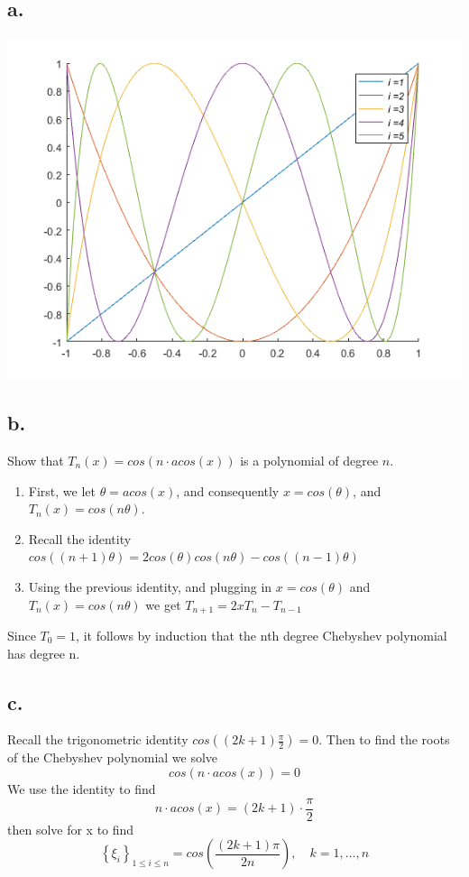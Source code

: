 \documentclass{article}
\begin{document}
\subsection*{a.}
\begin{center}
  \includegraphics[width=0.7
    \textwidth]{figures/question3}
\end{center}
\subsection*{b.}
Show that \(T_n(x)=cos(n\cdot acos(x))\) is a polynomial of degree
\(n\).
\begin{enumerate}
\item First, we let \(\theta=acos(x)\), and consequently
  \(x=cos(\theta)\), and \(T_n(x)=cos(n\theta)\).
  \item Recall the identity
    \(cos\left((n+1)\theta\right)=2cos(\theta)cos(n\theta)-cos\left((n-1)\theta\right)\)
\item Using the previous identity, and plugging in \(x=cos(\theta)\)
  and \(T_n(x)=cos(n\theta)\) we get
  \(T_{n+1}=2xT_n -T_{n-1}\)
\end{enumerate}
Since \(T_0=1\), it follows by induction that the nth degree Chebyshev
polynomial has degree n.
\subsection*{c.}
Recall the trigonometric identity
\(cos\left((2k+1)\frac{\pi}{2}\right)=0\). Then to find the roots of
the Chebyshev polynomial we solve
\[cos\left(n\cdot acos(x)\right)=0\]
We use the identity to find
\[n\cdot acos(x) = (2k+1)\cdot\frac{\pi}{2}\]
then solve for x to find
\[\left\{\xi_i\right\}_{1\leq i\leq n}=cos\left(\frac{(2k+1)\pi}{2n}\right),\quad k=1,\dots,n\]


\pagebreak
\section{}
\end{document}
